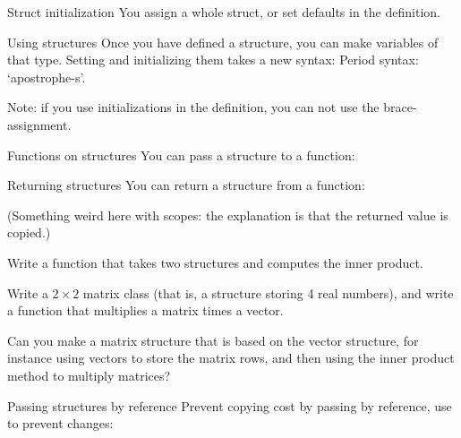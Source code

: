 \begin{block}{Struct initialization}
  \label{sl:structinit}
  You assign a whole struct, or set defaults in the definition.
\end{block}

\begin{block}{Using structures}
  \label{sl:struct-use}
  Once you have defined a structure, you can make variables of that
  type. Setting and initializing them takes a new syntax:
  Period syntax: `apostrophe-s'.
\end{block}

Note: if you use initializations in the  definition,
you can not use the brace-assignment.

\begin{block}{Functions on structures}
  \label{sl:struct-pass}
  You can pass a structure to a function:
\end{block}

\begin{block}{Returning structures}
  \label{sl:struct-return}
  You can return a structure from a function:

  (Something weird here with scopes: the explanation is that the
  returned value is copied.)
\end{block}

\begin{exercise}
  \label{ex:vecstruct}
  Write a function  that takes two 
  structures and computes the inner product.
\end{exercise}

\begin{exercise}
  \label{ex:matstruct}
  Write a $2\times 2$ matrix class (that is, a structure storing 4
  real numbers), and write a function 
  that multiplies a matrix times a vector.

  Can you make a matrix structure that is based on the vector
  structure, for instance using vectors to store the matrix rows, and
  then using the inner product method to multiply matrices?
\end{exercise}

\begin{block}{Passing structures by reference}
  \label{sl:struct-passref}
  Prevent copying cost by passing by reference, use  to
  prevent changes:
\end{block}



